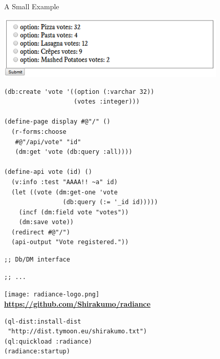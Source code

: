 \documentclass[12pt]{beamer}
\newcommand{\toptitle}[1]{
  {\huge #1} \\
  \vspace{0.2cm}
}
\begin{document}
\begin{frame}
  \toptitle{A Small Example}
  \includegraphics[height=3cm]{voter.png}
\end{frame}

\begin{frame}[fragile]
  \begin{verbatim}
(db:create 'vote '((option (:varchar 32))
                   (votes :integer)))

(define-page display #@"/" ()
  (r-forms:choose 
   #@"/api/vote" "id"
   (dm:get 'vote (db:query :all))))

(define-api vote (id) ()
  (v:info :test "AAAA!! ~a" id)
  (let ((vote (dm:get-one 'vote 
                (db:query (:= '_id id)))))
    (incf (dm:field vote "votes"))
    (dm:save vote))
  (redirect #@"/")
  (api-output "Vote registered."))
  \end{verbatim}
\end{frame}

\begin{frame}[fragile]
  \begin{verbatim}
;; Db/DM interface

  \end{verbatim}
\end{frame}

\begin{frame}[fragile]
  \begin{verbatim}
;; ...

  \end{verbatim}
\end{frame}

\begin{frame}

\end{frame}

\begin{frame}[fragile]
  \begin{center}
    \hskip1.2cm\texttt{[image: radiance-logo.png]} \\
    {\bfseries \url{https://github.com/Shirakumo/radiance}} \\
    \vspace{0.3cm}
    \begin{verbatim}
(ql-dist:install-dist 
 "http://dist.tymoon.eu/shirakumo.txt")
(ql:quickload :radiance)
(radiance:startup)
    \end{verbatim}
  \end{center}
\end{frame}
\end{document}
